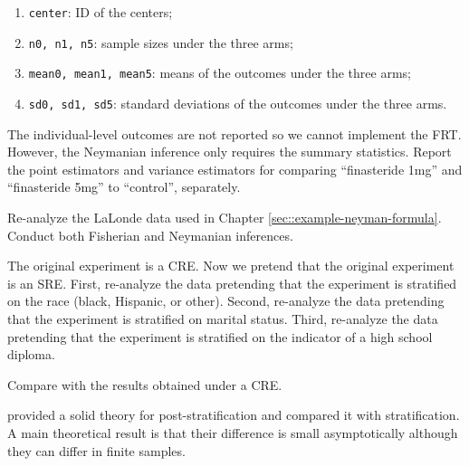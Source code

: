 \begin{HomeworkProblem}
\begin{enumerate}
\item
\texttt{center}: ID of the centers;
\item
\texttt{n0, n1, n5}: sample sizes under the three arms;
\item
\texttt{mean0, mean1, mean5}: means of the outcomes under the three arms;
\item
\texttt{sd0, sd1, sd5}: standard deviations of the outcomes under the three arms.
\end{enumerate}

The individual-level outcomes are not reported so we cannot implement the FRT. However, the Neymanian inference only requires the summary statistics. Report the point estimators and variance estimators for comparing ``finasteride 1mg'' and ``finasteride 5mg'' to ``control'', separately.


\end{HomeworkProblem}

\begin{HomeworkProblem}\label{exr:5-9}


Re-analyze the LaLonde data used in Chapter \ref{sec::example-neyman-formula}. Conduct both Fisherian and Neymanian inferences.

The original experiment is a CRE. Now we pretend that the original experiment is an SRE.
First, re-analyze the data pretending that the experiment is stratified on the race (black, Hispanic, or other). Second, re-analyze the data pretending that the experiment is stratified on marital status. Third, re-analyze the data pretending that the experiment is stratified on the indicator of a high school diploma.

Compare with the results obtained under a CRE.




\end{HomeworkProblem}

\begin{HomeworkProblem}\label{exr:5-10}

\citet{miratrix:2013} provided a solid theory for post-stratification and compared it with stratification. A main theoretical result is that their difference is small asymptotically although they can differ in finite samples.




\end{HomeworkProblem}
